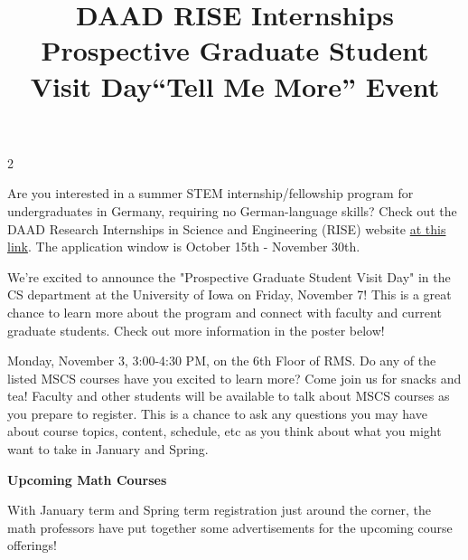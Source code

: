 \documentclass[12pt]{article}
\newcommand{\bolder}{\textbf}
\begin{document}
\begin{multicols}{2}
\begin{tcolorbox}[colback=white, colframe=black]
    \begin{center}
    \title{{\large \bolder{DAAD RISE Internships}}}
    \end{center}
\end{tcolorbox}

Are you interested in a summer STEM internship/fellowship program for undergraduates in Germany, requiring no German-language skills? Check out the DAAD Research Internships in Science and Engineering (RISE) website \href{https://www.daad.de/rise/en/}{at this link}. The application window is October 15th - November 30th.


 \begin{tcolorbox}[colback=white, colframe=black]
    \begin{center}
    \title{{\large \bolder{ Prospective Graduate Student Visit Day}}}
    \end{center}
\end{tcolorbox}
We’re excited to announce the "Prospective Graduate Student Visit Day" in the CS department at the University of Iowa on Friday, November 7! This is a great chance to learn more about the program and connect with faculty and current graduate students. Check out more information in the poster below!


\begin{tcolorbox}[colback=white, colframe=black]
    \begin{center}
    \title{{\large \bolder{``Tell Me More'' Event}}}
    \end{center}
\end{tcolorbox}
Monday, November 3, 3:00-4:30 PM, on the 6th Floor of RMS. Do any of the listed MSCS courses have you excited to learn more? 
Come join us for snacks and tea!  Faculty and other students will be available to talk about MSCS courses as you prepare to register.  This is a chance to ask any questions you may have about course topics, content, schedule, etc as you think about what you might want to take in January and Spring. 

\end{multicols}

\begin{center}
    {\Large \textbf{Upcoming Math Courses}}
\end{center}

With January term and Spring term registration just around the corner, the math professors have put together some advertisements for the upcoming course offerings!
\end{document}
